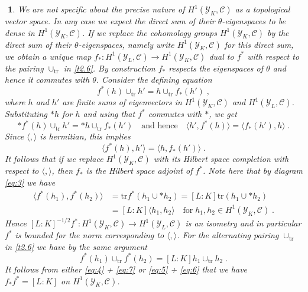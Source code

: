 \documentclass[12pt,leqno]{article}
\newcommand{\tr}{\mathrm{tr}}
\newcommand{\Ch}{{\mathcal C}}
\newcommand{\Yh}{\mathcal{Y}}
\newtheorem{punkt}[theorem]{$\!\!$}
\begin{document}
\begin{punkt} \label{t2.8} \em 
We are not specific about the precise nature of $H^1 (\Yh_K , \Ch)$ as a topological vector space. In any case we expect the direct sum of their $\theta$-eigenspaces to be dense in $H^1 (\Yh_K , \Ch)$. If we replace the cohomology groups $H^1 (\Yh_K , \Ch)$ by the direct sum of their $\theta$-eigenspaces, namely write $H^1 (\Yh_K , \Ch)$ for this direct sum, we obtain a unique map $f_* : H^1 (\Yh_L , \Ch) \to H^1 (\Yh_K , \Ch)$ dual to $f^*$ with respect to the pairing $\cup_{\tr}$ in \ref{t2.6}. By construction $f_*$ respects the eigenspaces of $\theta$ and hence it commutes with $\theta$. Consider the defining equation
\begin{equation}
\label{eq:4}
f^* (h) \cup_{\tr} h' = h \cup_{\tr} f_* (h') \; ,
\end{equation}
where $h$ and $h'$ are finite sums of eigenvectors in $H^1 (\Yh_K , \Ch)$ and $H^1 (\Yh_L , \Ch)$. Substituting $* h$ for $h$ and using that $f^*$ commutes with $*$, we get
\[
* f^* (h) \cup_{\tr} h' = * h \cup_{\tr} f_* (h') \quad \text{and hence} \quad \langle h' , f^* (h) \rangle = \langle f_* (h') , h \rangle \; .
\]
Since $\langle, \rangle$ is hermitian, this implies
\begin{equation}
\label{eq:5}
\langle f^* (h) , h' \rangle = \langle h , f_* (h') \rangle \; .
\end{equation}
It follows that if we replace $H^1 (\Yh_K , \Ch)$ with its Hilbert space completion with respect to $\langle , \rangle$, then $f_*$ is the Hilbert space adjoint of $f^*$. Note here that by diagram \eqref{eq:3} we have
\begin{align}
\langle f^* (h_1) , f^* (h_2) \rangle & = \tr f^* (h_1 \cup * h_2) = [L : K] \tr (h_1 \cup *h_2) \nonumber \\
& = [L : K] \langle h_1 , h_2 \rangle \quad \text{for} \; h_1 , h_2 \in H^1 (\Yh_K , \Ch) \; . \label{eq:6}
\end{align}
Hence $[L : K]^{- 1/2} f^* : H^1 (\Yh_K , \Ch) \to H^1 (\Yh_L , \Ch)$ is an isometry and in particular $f^*$ is bounded for the norm corresponding to $\langle , \rangle$. For the alternating pairing $\cup_{\tr}$ in \ref{t2.6} we have by the same argument
\begin{equation}
\label{eq:7}
f^* (h_1) \cup_{\tr} f^* (h_2) = [L : K] h_1 \cup_{\tr} h_2 \; .
\end{equation}
It follows from either \eqref{eq:4} + \eqref{eq:7} or \eqref{eq:5} + \eqref{eq:6} that we have $f_* f^* = [L : K]$ on $H^1 (\Yh_K , \Ch)$. 
\end{punkt}
\end{document}
